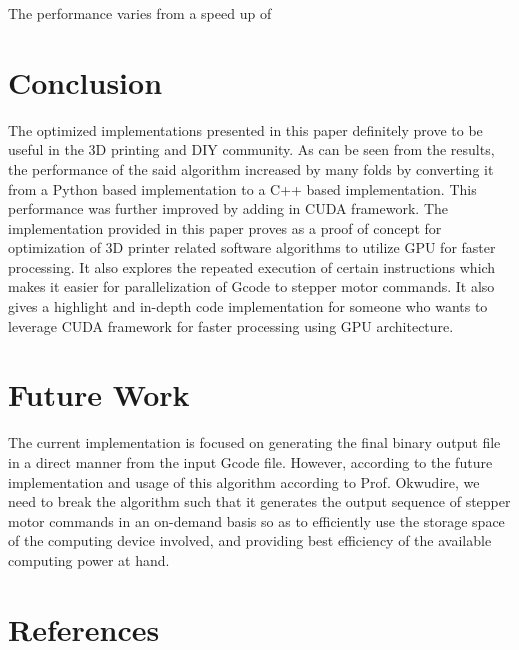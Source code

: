 \documentclass[12pt,letterpaper]{article}
\begin{document}
The performance varies from a speed up of 

\section{Conclusion}
The optimized implementations presented in this paper definitely prove to be useful in the 3D printing and DIY community. As can be seen from the results, the performance of the said algorithm increased by many folds by converting it from a Python based implementation to a C++ based implementation. This performance was further improved by adding in CUDA framework. The implementation provided in this paper proves as a proof of concept for optimization of 3D printer related software algorithms to utilize GPU for faster processing. It also explores the repeated execution of certain instructions which makes it easier for parallelization of Gcode to stepper motor commands.
It also gives a highlight and in-depth code implementation for someone who wants to leverage CUDA framework for faster processing using GPU architecture.

\section{Future Work}
The current implementation is focused on generating the final binary output file in a direct manner from the input Gcode file. However, according to the future implementation and usage of this algorithm according to Prof. Okwudire, we need to break the algorithm such that it generates the output sequence of stepper motor commands in an on-demand basis so as to efficiently use the storage space of the computing device involved, and providing best efficiency of the available computing power at hand.

\section{References\label{sec:references}}

\printbibliography[heading=none]
\end{document}
